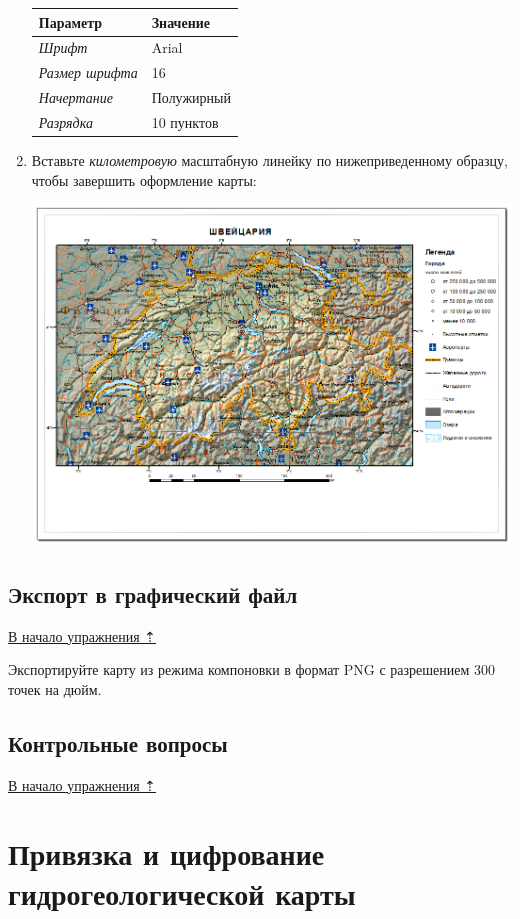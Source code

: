 \documentclass[]{book}
\theoremstyle{definition}
\theoremstyle{definition}
\theoremstyle{definition}
\theoremstyle{remark}
\begin{document}
\begin{enumerate}
  \begin{longtable}[]{@{}ll@{}}
  \toprule
  Параметр & Значение\tabularnewline
  \midrule
  \endhead
  \emph{Шрифт} & Arial\tabularnewline
  \emph{Размер шрифта} & 16\tabularnewline
  \emph{Начертание} & Полужирный\tabularnewline
  \emph{Разрядка} & 10 пунктов\tabularnewline
  \bottomrule
  \end{longtable}
\item
  Вставьте \emph{километровую} масштабную линейку по нижеприведенному
  образцу, чтобы завершить оформление карты:

  \includegraphics{images/Ex04/image28.png}
\end{enumerate}

\hypertarget{map-design-general-export}{%
\section{Экспорт в графический файл}\label{map-design-general-export}}

\protect\hyperlink{map-design-general}{В начало упражнения ⇡}

Экспортируйте карту из режима компоновки в формат PNG с разрешением 300
точек на дюйм.

\hypertarget{map-design-general-questions}{%
\section{Контрольные вопросы}\label{map-design-general-questions}}

\protect\hyperlink{map-design-general}{В начало упражнения ⇡}

\hypertarget{map-ref-hydrogeologic}{%
\chapter{Привязка и цифрование гидрогеологической
карты}\label{map-ref-hydrogeologic}}
\end{document}
